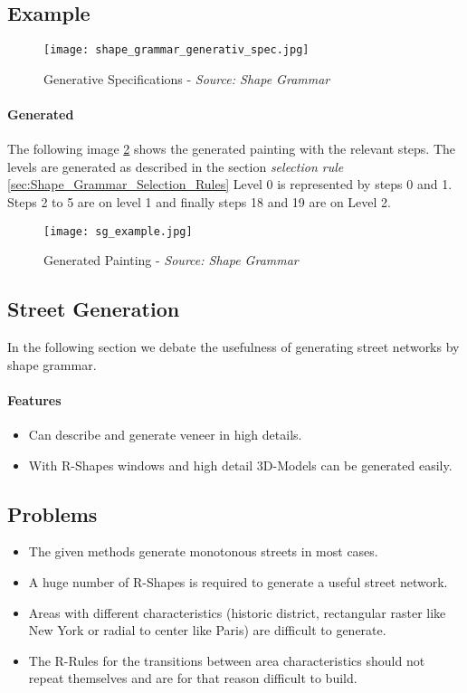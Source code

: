 \subsection{Example}
\begin{figure}[!h]
    \centering
    \texttt{[image: shape\_grammar\_generativ\_spec.jpg]}
    \caption{Generative Specifications - \textit{Source: Shape Grammar} \citep{shapeGrammars:1972}}
    \label{fig:shape_grammar_gen_specifications}
\end{figure}
\pagebreak
\paragraph{Generated}
The following image \ref{fig:Shape Grammars/Example} shows the generated painting with the relevant steps. The levels are generated as described in the section \textit{selection rule} \ref{sec:Shape_Grammar_Selection_Rules} 
\newline
Level 0 is represented by steps 0 and 1. Steps 2 to 5 are on level 1 and finally steps 18 and 19 are on Level 2.
\begin{figure}[!h]
    \centering
    \texttt{[image: sg\_example.jpg]}
    \caption{ Generated Painting - \textit{Source: Shape Grammar} \citep{shapeGrammars:1972}}
    \label{fig:Shape Grammars/Example}
\end{figure}

\newpage
\subsection{Street Generation}
In the following section we debate the usefulness of generating street networks by shape grammar. 
\paragraph{Features}
\begin{itemize}
    \item Can describe and generate veneer in high details.
    \item With R-Shapes windows and high detail 3D-Models can be generated easily.
\end{itemize}

\subsection{Problems}
\begin{itemize}
    \item The given methods generate monotonous streets in most cases. 
    \item A huge number of R-Shapes is required to generate a useful street network.
    \item Areas with different characteristics (historic district, rectangular raster like New York or radial to center like Paris) are difficult to generate.
    \item The R-Rules for the transitions between area characteristics should not repeat themselves and are for that reason difficult to build.
\end{itemize}

